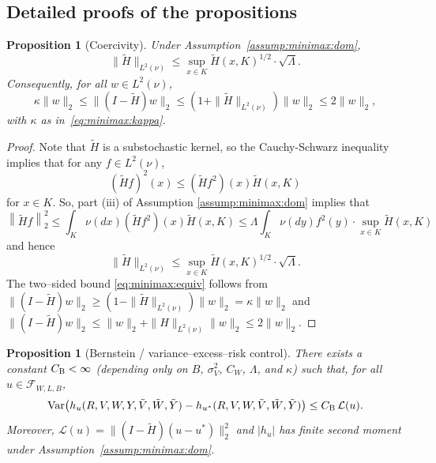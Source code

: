 \documentclass[pdflatex,sn-mathphys-ay]{sn-jnl}%
\numberwithin{equation}{section}
\newcommand\norm[1]{\left\lVert#1\right\rVert}
\theoremstyle{thmstyleone}%
\newtheorem{proposition}[theorem]{Proposition}%
\theoremstyle{thmstyletwo}%
\theoremstyle{thmstylethree}%
\begin{document}
\subsection{Detailed proofs of the propositions}

\begin{proposition}[Coercivity]\label{prop:minimax:coercive}
Under Assumption~\ref{assump:minimax:dom}, \[\|\tilde{H}\|_{L^2(\nu)} \le \sup_{x\in K}\tilde{H}(x,K)^{1/2}\cdot\sqrt{\Lambda}.\]  Consequently, for all \(w\in L^2(\nu)\),
\begin{equation}\label{eq:minimax:equiv}
\kappa\|w\|_2 \le \|(I-\tilde{H})w\|_2 \le (1+\|\tilde{H}\|_{L^2(\nu)})\|w\|_2 \le 2\|w\|_2,
\end{equation}
with \(\kappa\) as in~\eqref{eq:minimax:kappa}.
\end{proposition}
\begin{proof}[Proof]
Note that $\tilde{H}$ is a substochastic kernel, so the Cauchy-Schwarz inequality implies that for any $f\in L^2(\nu)$,
\[
(\tilde{H}f)^2(x)\leq(\tilde{H}f^2)(x)\tilde{H}(x,K)
\]
for $x\in K$. So, part (iii) of Assumption \ref{assump:minimax:dom} implies that 
\[
\norm{\tilde{H}f}_2^2\leq\int_K\nu(dx)(\tilde{H}f^2)(x)\tilde{H}(x,K)\leq\Lambda\int_K\nu(dy)f^2(y)\cdot\sup_{x\in K}\tilde{H}(x,K)
\]
and hence \[\|\tilde{H}\|_{L^2(\nu)} \le \sup_{x\in K}\tilde{H}(x,K)^{1/2}\cdot\sqrt{\Lambda}.\]
The two–sided bound \eqref{eq:minimax:equiv} follows from \(\|(I-\tilde{H})w\|_2\ge (1-\|\tilde{H}\|_{L^2(\nu)})\|w\|_2=\kappa \|w\|_2\) and \(\|(I-\tilde{H})w\|_2\le \|w\|_2+\|H\|_{L^2(\nu)}\|w\|_2\le 2\|w\|_2\).
\end{proof}


\begin{proposition}[Bernstein / variance–excess–risk control]\label{prop:minimax:bernstein}
There exists a constant \(C_{\rm B}<\infty\) (depending only on \(B\), \(\sigma_V^2\), \(C_W\), \(\Lambda\), and \(\kappa\)) such that, for all \(u\in\mathcal{F}_{W,L,B}\),
\begin{equation*}
\operatorname{Var}\!\left(h_u(R,V,W,Y,\tilde V,\tilde W,\tilde Y)-h_{u^*}(R,V,W,\tilde V,\tilde W,\tilde Y)\right) \le C_{\rm B}\,\mathcal{L}(u).
\end{equation*}
Moreover, \(\mathcal{L}(u)=\|(I-\tilde H)(u-u^*)\|_2^2\) and \(|h_u|\) has finite second moment under Assumption~\ref{assump:minimax:dom}.
\end{proposition}
\end{document}
